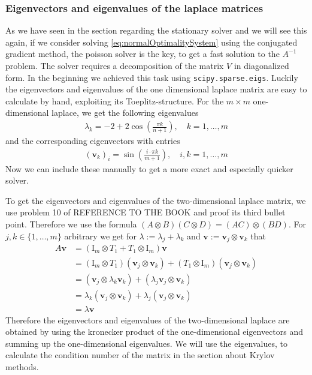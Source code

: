 \documentclass{amsart}
\theoremstyle{definition}
\theoremstyle{remark}
\numberwithin{equation}{section}
\renewcommand{\vec}{\textbf}
\begin{document}
\subsubsection{Eigenvectors and eigenvalues of the laplace matrices}
As we have seen in the section regarding the stationary solver and we will see this again, if we consider solving \eqref{eq:normalOptimalitySystem} 
using the conjugated gradient method, the poisson solver is the key, to get a fast solution to the $A^{-1}$ problem. The solver requires a decomposition
of the matrix $V$ in diagonalized form. In the beginning we achieved this task using \texttt{scipy.sparse.eigs}. Luckily the eigenvectors and eigenvalues
of the one dimensional laplace matrix are easy to calculate by hand, exploiting its Toeplitz-structure. For the $m\times m$ one-dimensional laplace, we 
get the following eigenvalues
\begin{align*}
\lambda_k = -2 + 2 \cos \left( \frac{\pi k}{n+1} \right), \quad k=1,\ldots, m
\end{align*} 
and the corresponding eigenvectors with entries
\begin{align*}
(\vec{v}_k)_i = \sin\left(\frac{i\cdot \pi k}{m+1} \right), \quad i,k=1,\ldots,m
\end{align*}
Now we can include these manually to get a more exact and especially quicker solver.

To get the eigenvectors and eigenvalues of the two-dimensional laplace matrix, we use problem 10 of REFERENCE TO THE BOOK and proof its third bullet 
point. Therefore we use the formula $(A \otimes B)(C \otimes D) = (AC) \otimes (BD)$. For $j,k \in \{1, \ldots, m\}$ arbitrary we get for $\lambda := 
\lambda_j + \lambda_k$ and $\vec{v} := \vec{v}_j \otimes \vec{v}_k$ that
\begin{align*}
A\vec{v} &= \left(\text{I}_m \otimes T_1 + T_1 \otimes \text{I}_m \right) \vec{v}\\
&= \left( \text{I}_m \otimes T_1\right)\left(\vec{v}_j \otimes \vec{v}_k\right) + \left( T_1 \otimes \text{I}_m\right)\left(\vec{v}_j \otimes \vec{v}_k\right)\\
&= \left( \vec{v}_j \otimes \lambda_k \vec{v}_k\right) + \left( \lambda_j\vec{v}_j \otimes  \vec{v}_k\right)\\
&= \lambda_k\left( \vec{v}_j \otimes  \vec{v}_k\right) + \lambda_j\left( \vec{v}_j \otimes  \vec{v}_k\right)\\
&= \lambda \vec{v}
\end{align*}
Therefore the eigenvectors and eigenvalues of the two-dimensional laplace are obtained by using the kronecker product of the one-dimensional eigenvectors
and summing up the one-dimensional eigenvalues. We will use the eigenvalues, to calculate the condition number of the matrix in the section
about Krylov methods.
\end{document}
